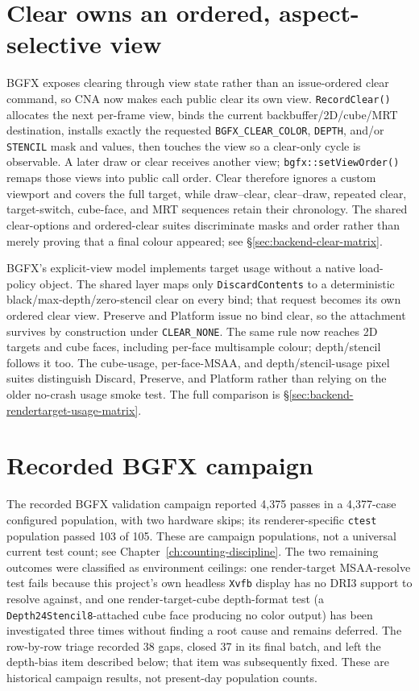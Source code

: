 \section{Clear owns an ordered, aspect-selective view}

BGFX exposes clearing through view state rather than an issue-ordered clear command, so CNA
now makes each public clear its own view. \texttt{RecordClear()} allocates the next per-frame
view, binds the current backbuffer/2D/cube/MRT destination, installs exactly the requested
\texttt{BGFX\_CLEAR\_COLOR}, \texttt{DEPTH}, and/or \texttt{STENCIL} mask and values, then
touches the view so a clear-only cycle is observable. A later draw or clear receives another
view; \texttt{bgfx::setViewOrder()} remaps those views into public call order. Clear therefore
ignores a custom viewport and covers the full target, while draw--clear, clear--draw, repeated
clear, target-switch, cube-face, and MRT sequences retain their chronology. The shared
clear-options and ordered-clear suites discriminate masks and order rather than merely proving
that a final colour appeared; see \S\ref{sec:backend-clear-matrix}.

BGFX's explicit-view model implements target usage without a native load-policy object. The
shared layer maps only \texttt{DiscardContents} to a deterministic black/max-depth/zero-stencil
clear on every bind; that request becomes its own ordered clear view. Preserve and Platform
issue no bind clear, so the attachment survives by construction under \texttt{CLEAR\_NONE}.
The same rule now reaches 2D targets and cube faces, including per-face multisample colour;
depth/stencil follows it too. The cube-usage, per-face-MSAA, and depth/stencil-usage pixel suites
distinguish Discard, Preserve, and Platform rather than relying on the older no-crash usage
smoke test. The full comparison is \S\ref{sec:backend-rendertarget-usage-matrix}.

\section{Recorded BGFX campaign}

The recorded BGFX validation campaign reported 4{,}375 passes in a 4{,}377-case configured
population, with two hardware skips; its renderer-specific \texttt{ctest} population passed
103 of 105.  These are campaign populations, not a universal current test count; see
Chapter~\ref{ch:counting-discipline}. The two remaining outcomes were classified as environment
ceilings: one render-target MSAA-resolve test
fails because this project's own headless \texttt{Xvfb} display has no DRI3 support to
resolve against, and one render-target-cube depth-format test (a
\texttt{Depth24Stencil8}-attached cube face producing no color output) has been investigated
three times without finding a root cause and remains deferred. The row-by-row triage recorded
38 gaps, closed 37 in its final batch, and left the depth-bias item described below; that item was
subsequently fixed. These are historical campaign results, not present-day population counts.

